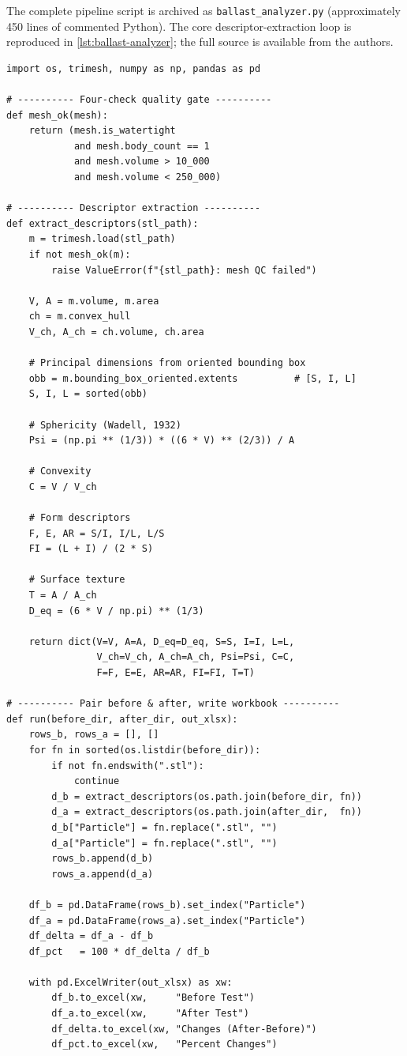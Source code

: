 The complete pipeline script is archived as \texttt{ballast\_analyzer.py}
(approximately \num{450} lines of commented Python). The core
descriptor-extraction loop is reproduced in
\cref{lst:ballast-analyzer}; the full source is available from the
authors.

\begin{lstlisting}[caption={Core extraction logic of
\texttt{ballast\_analyzer.py}.},label={lst:ballast-analyzer}]
import os, trimesh, numpy as np, pandas as pd

# ---------- Four-check quality gate ----------
def mesh_ok(mesh):
    return (mesh.is_watertight
            and mesh.body_count == 1
            and mesh.volume > 10_000
            and mesh.volume < 250_000)

# ---------- Descriptor extraction ----------
def extract_descriptors(stl_path):
    m = trimesh.load(stl_path)
    if not mesh_ok(m):
        raise ValueError(f"{stl_path}: mesh QC failed")

    V, A = m.volume, m.area
    ch = m.convex_hull
    V_ch, A_ch = ch.volume, ch.area

    # Principal dimensions from oriented bounding box
    obb = m.bounding_box_oriented.extents          # [S, I, L]
    S, I, L = sorted(obb)

    # Sphericity (Wadell, 1932)
    Psi = (np.pi ** (1/3)) * ((6 * V) ** (2/3)) / A

    # Convexity
    C = V / V_ch

    # Form descriptors
    F, E, AR = S/I, I/L, L/S
    FI = (L + I) / (2 * S)

    # Surface texture
    T = A / A_ch
    D_eq = (6 * V / np.pi) ** (1/3)

    return dict(V=V, A=A, D_eq=D_eq, S=S, I=I, L=L,
                V_ch=V_ch, A_ch=A_ch, Psi=Psi, C=C,
                F=F, E=E, AR=AR, FI=FI, T=T)

# ---------- Pair before & after, write workbook ----------
def run(before_dir, after_dir, out_xlsx):
    rows_b, rows_a = [], []
    for fn in sorted(os.listdir(before_dir)):
        if not fn.endswith(".stl"):
            continue
        d_b = extract_descriptors(os.path.join(before_dir, fn))
        d_a = extract_descriptors(os.path.join(after_dir,  fn))
        d_b["Particle"] = fn.replace(".stl", "")
        d_a["Particle"] = fn.replace(".stl", "")
        rows_b.append(d_b)
        rows_a.append(d_a)

    df_b = pd.DataFrame(rows_b).set_index("Particle")
    df_a = pd.DataFrame(rows_a).set_index("Particle")
    df_delta = df_a - df_b
    df_pct   = 100 * df_delta / df_b

    with pd.ExcelWriter(out_xlsx) as xw:
        df_b.to_excel(xw,     "Before Test")
        df_a.to_excel(xw,     "After Test")
        df_delta.to_excel(xw, "Changes (After-Before)")
        df_pct.to_excel(xw,   "Percent Changes")
\end{lstlisting}

